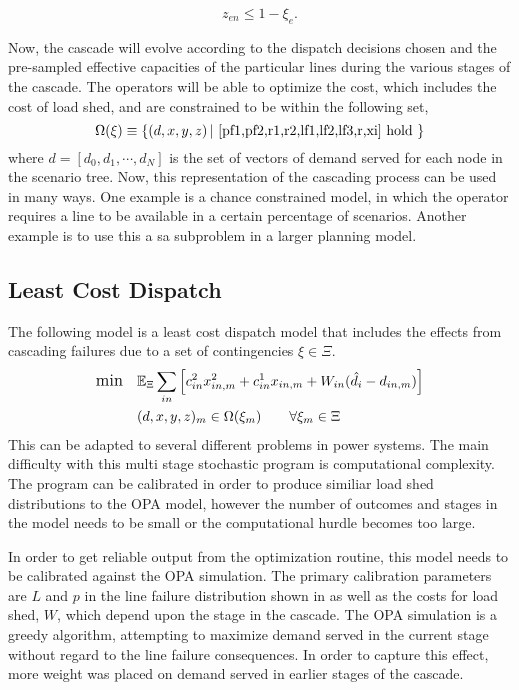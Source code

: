 \begin{equation}
z_{en} \le 1- \xi_e . \label{xi}
\end{equation}

Now, the cascade will evolve according to the dispatch decisions chosen and the pre-sampled effective capacities of the particular lines during the various stages of the cascade.  The operators will be able to optimize the cost, which includes the cost of load shed, and are constrained to be within the following set, 
\begin{equation}
\Omega(\xi) \equiv \left\{ \left(d, x, y, z \right)  |  \mbox{ \Cref{pf1,pf2,r1,r2,lf1,lf2,lf3,r,xi}  hold } \right\} 
\end{equation}
where $d = \left[ d_0, d_1, \cdots, d_N \right]$ is the set of vectors of demand served for each node in the scenario tree.  Now, this representation of the cascading process can be used in many ways.  One example is a chance constrained model, in which the operator requires a line to be available in a certain percentage of scenarios.  Another example is to use this a sa subproblem in a larger planning model. 

\subsection{Least Cost Dispatch}
The following model is a least cost dispatch model that includes the effects from cascading failures due to a set of contingencies $\xi\in\Xi$.
\begin{subequations}
\label{leastcost}
\begin{align} \displaystyle
	{\large \mbox{min}} \hspace{10px} &  \Expect_\Xi \sum_{in} \left[ c^2_{in}  x^2_{in,m} + c^1_{in} x_{in,m}  + W_{in} (\hat{d}_{i} - d_{in,m}) \right]	\\
	&(d,x,y,z)_m  \in \Omega(\xi_m)    \hspace{20px}   \forall \xi_m \in \Xi	
\end{align}
\end{subequations}
This can be adapted to several different problems in power systems.  The main difficulty with this multi stage stochastic program is computational complexity.  The program can be calibrated in order to produce similiar load shed distributions to the OPA model, however the number of outcomes and stages in the model needs to be small or the computational hurdle becomes too large.

In order to get reliable output from the optimization routine, this model needs to be calibrated against the OPA simulation.  The primary calibration parameters are $L$ and $p$ in the line failure distribution shown in  as well as the costs for load shed, $W$, which depend upon the stage in the cascade.  The OPA simulation is a greedy algorithm, attempting to maximize demand served in the current stage without regard to the line failure consequences.  In order to capture this effect, more weight was placed on demand served in earlier stages of the cascade. \\

